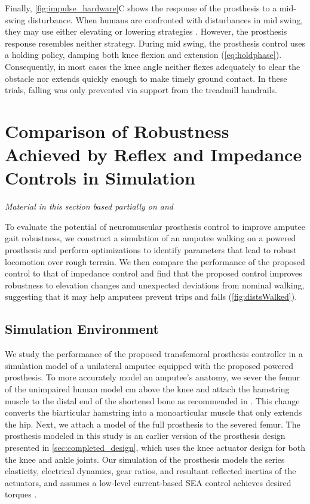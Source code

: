 Finally, \cref{fig:impulse_hardware}C shows the response of the
prosthesis to a mid-swing disturbance. When humans are confronted with
disturbances in mid swing, they may use either elevating or lowering strategies
\citep{eng1994strategies, schillings2000muscular}. However, the prosthesis
response resembles neither strategy. During mid swing, the prosthesis control
uses a holding policy, damping both knee flexion and extension
(\cref{eq:holdphase}). Consequently, in most cases the knee angle neither
flexes adequately to clear the obstacle nor extends quickly enough to make
timely ground contact. In these trials, falling was only prevented via support
from the treadmill handrails.

\section{Comparison of Robustness Achieved by Reflex and Impedance Controls in
    Simulation}\label{sec:completed_comparison}

\emph{Material in this section based partially on 
\citet{thatte2016toward}\cite{thatte2016toward} 
and \citet{thatte2014towards}\cite[0.25in]{thatte2014towards}}
\linebreak

To evaluate the potential of neuromuscular prosthesis control to improve amputee
gait robustness, we construct a simulation of an amputee walking on a powered
prosthesis and perform optimizations to identify parameters that lead to robust
locomotion over rough terrain. We then compare the performance of the proposed
control to that of impedance control and find that the proposed control improves
robustness to elevation changes and unexpected deviations from nominal walking,
suggesting that it may help amputees prevent trips and falls
(\cref{fig:distsWalked}).

\subsection{Simulation Environment}\label{sec:complete_simulation_environ}
We study the performance of the proposed transfemoral prosthesis controller in a
simulation model of a unilateral amputee equipped with the proposed powered
prosthesis. To more accurately model an amputee's anatomy, we sever the femur of
the unimpaired human model \unit[11]{cm} above the knee and attach the hamstring
muscle to the distal end of the shortened bone as recommended in
\citet{brown2012amputation}. This change converts the biarticular hamstring into
a monoarticular muscle that only extends the hip. Next, we attach a model of the
full prosthesis to the severed femur. The prosthesis modeled in this study is an
earlier version of the prosthesis design presented in
\cref{sec:completed_design}, which uses the knee actuator design for both the
knee and ankle joints. Our simulation of the prosthesis models the series
elasticity, electrical dynamics, gear ratios, and resultant reflected inertias
of the actuators, and assumes a low-level current-based SEA control achieves
desired torques \citep{pratt1995series}.

